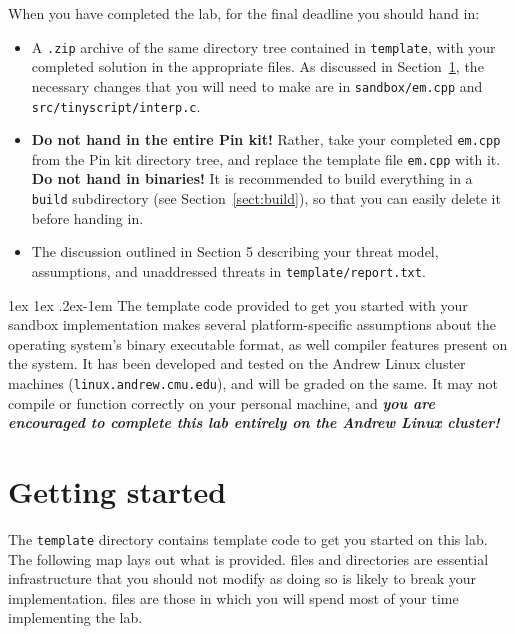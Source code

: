 \documentclass[11pt]{article}
\makeatletter
\renewcommand{\paragraph}{%
  \@startsection{paragraph}{4}%
  {\z@}{1ex \@plus 1ex \@minus .2ex}{-1em}%
  {\normalfont\normalsize\bfseries}
}
\makeatother
\begin{document}
When you have completed the lab, for the final deadline you should hand in:
\begin{itemize}[noitemsep,topsep=0pt]
\item A \verb'.zip' archive of the same directory tree contained in \verb'template', with your completed solution in the appropriate files. As discussed in Section~\ref{sect:start}, the necessary changes that you will need to make are in \verb'sandbox/em.cpp' and \verb'src/tinyscript/interp.c'. 
\item \textbf{Do not hand in the entire Pin kit!} Rather, take your completed \verb'em.cpp' from the Pin kit directory tree, and replace the template file \verb'em.cpp' with it. \textbf{Do not hand in binaries!} It is recommended to build everything in a \verb'build' subdirectory (see Section~\ref{sect:build}), so that you can easily delete it before handing in.
\item The discussion outlined in Section 5 describing your threat model, assumptions, and unaddressed threats in \texttt{template/report.txt}.
\end{itemize}

\paragraph{\large \color{red}{Important!}} The template code provided to get you started with your sandbox implementation makes several platform-specific assumptions about the operating system's binary executable format, as well compiler features present on the system. It has been developed and tested on the Andrew Linux cluster machines (\verb'linux.andrew.cmu.edu'), and will be graded on the same. It may not compile or function correctly on your personal machine, and \textbf{\emph{you are encouraged to complete this lab entirely on the Andrew Linux cluster!}}
\newpage

\section{Getting started}
\label{sect:start}

The \verb'template' directory contains template code to get you started on this lab. The following map lays out what is provided. {\color{red}{Red}} files and directories are essential infrastructure that you should not modify as doing so is likely to break your implementation. {\color{blue}{Blue}} files are those in which you will spend most of your time implementing the lab.
\\
\end{document}
